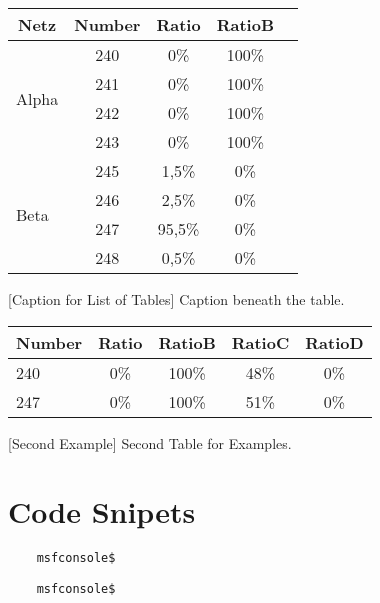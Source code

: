 \documentclass[../main]{subfiles}
\begin{document}
\vspace{1em}
\begin{table}[H]
	\centering
	\begin{tabular}{l|cccc}
		\toprule
		\multicolumn{1}{c}{\textbf{Netz}} 
		& \multicolumn{1}{c}{\textbf{Number}}
		& \multicolumn{1}{c}{\textbf{Ratio}}
		& \multicolumn{1}{c}{\textbf{RatioB}} \\
		\midrule
		\multirow{4}{*}{Alpha}
		& 240 & 0\% & 100\% \\
		& 241 & 0\% & 100\% \\
		& 242 & 0\% & 100\% \\
		& 243 & 0\% & 100\% \\
		\cmidrule(lr){1-1}
		\cmidrule(lr){2-4}
		\multirow{4}{*}{Beta}
		& 245 & 1,5\% & 0\% \\
		& 246 & 2,5\% & 0\% \\
		& 247 & 95,5\% & 0\% \\
		& 248 & 0,5\% & 0\% \\
		\bottomrule
	\end{tabular} 
	[Caption for List of Tables]
    {Caption beneath the table.}
	\label{tab:example_table}
\end{table}


\vspace{1em}
\begin{table}[H]
	\centering
	\begin{tabular}{l|cccc}
		\toprule
		\multicolumn{1}{c}{\textbf{Number}} 
		& \multicolumn{1}{c}{\textbf{Ratio}}
		& \multicolumn{1}{c}{\textbf{RatioB}} 
		& \multicolumn{1}{c}{\textbf{RatioC}}
		& \multicolumn{1}{c}{\textbf{RatioD}}\\
		\midrule
		240 	& 0\% & 100\% & 48\% & 0\% \\
		247 	& 0\% & 100\% & 51\% & 0\% \\
		\bottomrule
	\end{tabular} 
	[Second Example]
    {Second Table for Examples.}
	\label{tab:vergleich_netz_alpha_vs_beta}
\end{table}

\section{Code Snipets}

\begin{listing}[H]
    \centering
    \begin{verbatim}
    msfconsole$ 
    \end{verbatim}
    \label{code:upgrade-shell}
\end{listing}

\begin{longlisting}
    \centering
    \begin{verbatim}
    msfconsole$ 
    \end{verbatim}
    \label{code:longlisting-shell}
\end{longlisting}
\end{document}

